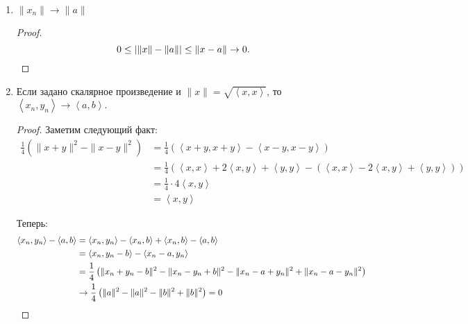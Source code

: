 \begin{theorem}
\begin{enumerate}
\begin{proof}
                $-y_{n} = -1 \cdot y_{n} \implies -1 \cdot b = -b$, $x_{n} + (-y_{n}) \to a + (-b) = a - b$.
            \end{proof}
        \item $\|x_{n}\| \to \|a\|$ 
            \begin{proof} \thmslashn
            
                \[ 0 \le \left| \|x\| - \|a\| \right| \le \|x - a\| \to 0 .\qedhere\] 
            \end{proof}
        \item Если задано скалярное произведение и $\|x\| = \sqrt{\left<x, x\right>} $, то $\left<x_{n}, y_{n}\right> \to \left<a, b\right>$.
            \begin{proof} \thmslashn
            
                Заметим следующий факт:
                \begin{equation*}
                    \begin{split}
                        \frac{1}{4}\left( \|x + y\|^2 - \|x - y\|^2 \right) 
                        &= \frac{1}{4}\left( \left<x + y, x + y\right> - \left<x - y, x - y\right> \right) \\
                        &= \frac{1}{4}\left( \left<x, x\right> + 2\left<x, y\right> + \left<y, y\right> - \left( \left<x, x\right> -2\left<x, y\right> + \left<y, y\right> \right)  \right)\\
                        &= \frac{1}{4} \cdot 4\left<x, y\right>\\
                        &= \left<x, y\right>
                    \end{split}
                \end{equation*}

                Теперь:
                \begin{equation*}
                    \begin{split}
                        \left<x_{n}, y_{n}\right> - \left<a, b\right> 
                        &= \left<x_{n}, y_{n}\right> - \left<x_{n}, b\right> + \left<x_{n}, b\right> - \left<a, b\right>\\
                        &= \left<x_{n}, y_{n} - b\right> - \left<x_{n} - a, y_{n}\right>\\
                        &= \frac{1}{4}\left( \|x_{n} + y_{n} - b\|^2 - \|x_{n} - y_{n} + b\|^2 - \|x_{n} - a + y_{n}\|^2 + \|x_{n} - a - y_{n}\|^2  \right)\\
                        &\to  \frac{1}{4}\left( \|a\|^2 - \|a\|^2 - \|b\|^2 + \|b\|^2  \right) = 0 \qedhere 
                    \end{split}
                \end{equation*}
            \end{proof}
    \end{enumerate}
\end{theorem}
